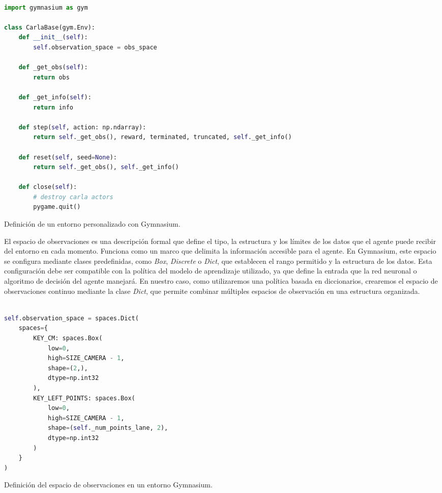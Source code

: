 \begin{code}[h]
\begin{lstlisting}[language=Python]

import gymnasium as gym

class CarlaBase(gym.Env):
    def __init__(self):
        self.observation_space = obs_space
    
    def _get_obs(self):
        return obs
    
    def _get_info(self):
        return info
    
    def step(self, action: np.ndarray):
        return self._get_obs(), reward, terminated, truncated, self._get_info()
   
    def reset(self, seed=None):
        return self._get_obs(), self._get_info()
    
    def close(self):
        # destroy carla actors
        pygame.quit()

\end{lstlisting}
\caption[Definición de un entorno personalizado en Gymnasium]{Definición de un entorno personalizado con Gymnasium.}
\label{cod:gym}
\end{code}

El espacio de observaciones es una descripción formal que define el tipo, la estructura y los límites de los datos que el agente puede recibir del entorno en cada momento. Funciona como un marco que delimita la información accesible para el agente. En Gymnasium, este espacio se configura mediante clases predefinidas, como \textit{Box}, \textit{Discrete} o \textit{Dict}, que establecen el rango permitido y la estructura de los datos. Esta configuración debe ser compatible con la política del modelo de aprendizaje utilizado, ya que define la entrada que la red neuronal o algoritmo de decisión del agente manejará. En nuestro caso, como utilizaremos una política basada en diccionarios, crearemos el espacio de observaciones continuo mediante la clase \textit{Dict}, que permite combinar múltiples espacios de observación en una estructura organizada.

\begin{code}[h]
\begin{lstlisting}[language=Python]

self.observation_space = spaces.Dict(
	spaces={
		KEY_CM: spaces.Box(
			low=0,
			high=SIZE_CAMERA - 1,
			shape=(2,),
			dtype=np.int32
		),
		KEY_LEFT_POINTS: spaces.Box(
			low=0,
			high=SIZE_CAMERA - 1,
			shape=(self._num_points_lane, 2),
			dtype=np.int32
		)
	}
)


\end{lstlisting}
\caption[Definición del espacio de observaciones en un entorno Gymnasium]{Definición del espacio de observaciones en un entorno Gymnasium.}
\label{cod:gymobs}
\end{code}

